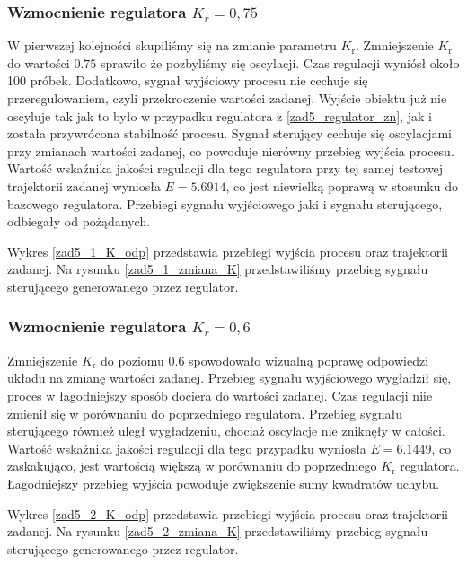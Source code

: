 \subsubsection{Wzmocnienie regulatora $K_{r}=0,75$}
W pierwszej kolejności skupiliśmy się na zmianie parametru $K_{\mathrm{r}}$.
Zmniejszenie $K_{\mathrm{r}}$ do wartości $\num{0.75}$ sprawiło że pozbyliśmy się oscylacji. Czas regulacji
wyniósł około 100 próbek. Dodatkowo, sygnał wyjściowy procesu nie cechuje się przeregulowaniem,
czyli przekroczenie wartości zadanej. Wyjście obiektu już nie oscyluje tak jak to było w przypadku regulatora z \ref{zad5_regulator_zn},
jak i została przywrócona stabilność procesu. Sygnał sterujący cechuje się oscylacjami przy zmianach
wartości zadanej, co powoduje nierówny przebieg wyjścia procesu.
Wartość wskaźnika jakości regulacji dla tego regulatora przy tej samej
testowej trajektorii zadanej wyniosła $E=\num{5,6914}$, co jest niewielką poprawą w stosunku 
do bazowego regulatora.
Przebiegi sygnału wyjściowego jaki i sygnału sterującego, odbiegały od pożądanych.

Wykres \ref{zad5_1_K_odp} przedstawia przebiegi wyjścia procesu oraz trajektorii zadanej.
Na rysunku \ref{zad5_1_zmiana_K} przedstawiliśmy przebieg sygnału sterującego generowanego przez regulator.

\subsubsection{Wzmocnienie regulatora $K_{r}=0,6$}
Zmniejszenie $K_{\mathrm{r}}$ do poziomu $\num{0,6}$ spowodowało wizualną poprawę odpowiedzi układu 
na zmianę wartości zadanej. Przebieg sygnału wyjściowego wygładził się, proces w łagodniejszy sposób
dociera do wartości zadanej. Czas regulacji niie zmienił się w porównaniu do poprzedniego regulatora.
Przebieg sygnału sterującego również uległ wygładzeniu, chociaż oscylacje nie zniknęły w całości.
Wartość wskaźnika jakości regulacji dla tego 
przypadku wyniosła $E=\num{6.1449}$, co zaskakująco, jest wartością większą w porównaniu do poprzedniego 
$K_{\mathrm{r}}$ regulatora. Łagodniejszy przebieg wyjścia powoduje zwiększenie sumy kwadratów uchybu.

Wykres \ref{zad5_2_K_odp} przedstawia przebiegi wyjścia procesu oraz trajektorii zadanej.
Na rysunku \ref{zad5_2_zmiana_K} przedstawiliśmy przebieg sygnału sterującego generowanego przez regulator.

